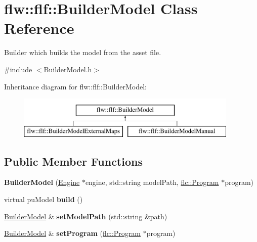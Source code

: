 \hypertarget{classflw_1_1flf_1_1BuilderModel}{}\section{flw\+:\+:flf\+:\+:Builder\+Model Class Reference}
\label{classflw_1_1flf_1_1BuilderModel}


Builder which builds the model from the asset file.  




{\ttfamily \#include $<$Builder\+Model.\+h$>$}

Inheritance diagram for flw\+:\+:flf\+:\+:Builder\+Model\+:\begin{figure}[H]
\begin{center}
\leavevmode
\includegraphics[height=2.000000cm]{classflw_1_1flf_1_1BuilderModel}
\end{center}
\end{figure}
\subsection*{Public Member Functions}
\begin{DoxyCompactItemize}
\item 
{\bfseries Builder\+Model} (\hyperlink{classflw_1_1Engine}{Engine} $\ast$engine, std\+::string model\+Path, \hyperlink{classflw_1_1flc_1_1Program}{flc\+::\+Program} $\ast$program)\hypertarget{classflw_1_1flf_1_1BuilderModel_a2bdb7cf2baa8140b6a7fe9de8f178ccf}{}\label{classflw_1_1flf_1_1BuilderModel_a2bdb7cf2baa8140b6a7fe9de8f178ccf}

\item 
virtual pu\+Model {\bfseries build} ()\hypertarget{classflw_1_1flf_1_1BuilderModel_ab5ec429a3559b7b4f0aff98980106805}{}\label{classflw_1_1flf_1_1BuilderModel_ab5ec429a3559b7b4f0aff98980106805}

\item 
\hyperlink{classflw_1_1flf_1_1BuilderModel}{Builder\+Model} \& {\bfseries set\+Model\+Path} (std\+::string \&path)\hypertarget{classflw_1_1flf_1_1BuilderModel_a049974f188c679dbf4ef514ccad13f68}{}\label{classflw_1_1flf_1_1BuilderModel_a049974f188c679dbf4ef514ccad13f68}

\item 
\hyperlink{classflw_1_1flf_1_1BuilderModel}{Builder\+Model} \& {\bfseries set\+Program} (\hyperlink{classflw_1_1flc_1_1Program}{flc\+::\+Program} $\ast$program)\hypertarget{classflw_1_1flf_1_1BuilderModel_a274c0199bf3197984efe7847a4d2052c}{}\label{classflw_1_1flf_1_1BuilderModel_a274c0199bf3197984efe7847a4d2052c}

\end{DoxyCompactItemize}
